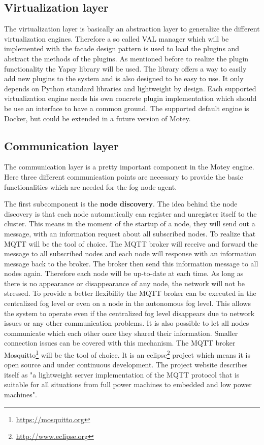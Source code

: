 \subsection{Virtualization layer}
The virtualization layer is basically an abstraction layer to generalize the different virtualization engines.
Therefore a so called \ac{VAL} manager which will be implemented with the facade design pattern is used to load the plugins and abstract the methods of the plugins.
As mentioned before to realize the plugin functionality the Yapsy library will be used.
The library offers a way to easily add new plugins to the system and is also designed to be easy to use.
It only depends on Python standard libraries and lightweight by design.
Each supported virtualization engine needs his own concrete plugin implementation which should be use an interface to have a common ground.
The supported default engine is Docker, but could be extended in a future version of Motey.


\subsection{Communication layer}
\label{subsection:CommunicationLayer}
The communication layer is a pretty important component in the Motey engine.
Here three different communication points are necessary to provide the basic functionalities which are needed for the fog node agent.

The first subcomponent is the \textbf{node discovery}.
The idea behind the node discovery is that each node automatically can register and unregister itself to the cluster.
This means in the moment of the startup of a node, they will send out a message, with an information request about all subscribed nodes.
To realize that \ac{MQTT} will be the tool of choice.
The \ac{MQTT} broker will receive and forward the message to all subscribed nodes and each node will response with an information message back to the broker.
The broker then send this information message to all nodes again.
Therefore each node will be up-to-date at each time.
As long as there is no appearance or disappearance of any node, the network will not be stressed.
To provide a better flexibility the \ac{MQTT} broker can be executed in the centralized fog level or even on a node in the autonomous fog level.
This allows the system to operate even if the centralized fog level disappears due to network issues or any other communication problems.
It is also possible to let all nodes communicate which each other once they shared their information.
Smaller connection issues can be covered with this mechanism.
The \ac{MQTT} broker Mosquitto\footnote{\url{https://mosquitto.org}} will be the tool of choice.
It is an eclipse\footnote{\url{http://www.eclipse.org}} project which means it is open source and under continuous development.
The project website describes itself as "a lightweight server implementation of the MQTT protocol that is suitable for all situations from full power machines to embedded and low power machines"\autocite{Eclipse:Mosquitto}.

